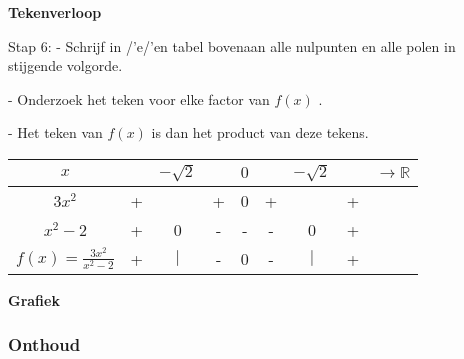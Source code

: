 \textbf{Tekenverloop}

Stap 6: - Schrijf in /'e/'en tabel bovenaan alle nulpunten en alle polen
in stijgende volgorde. 

- Onderzoek het teken voor elke factor van $f(x)$ . 

- Het teken van $f(x)$ is dan het product van deze tekens.

\medskip{}


\begin{tabular}{|c||c|c|c|c|c|c|c|c|}
\hline 
$x$ &  & $-\sqrt{2}$ &  & $0$ &  & $-\sqrt{2}$ &  & ${\displaystyle \longrightarrow\mathbb{R}}$\tabularnewline
\hline 
\hline 
${\displaystyle 3x^{2}}$ & + &  & + & 0 & + &  & + & \tabularnewline
\hline 
${\displaystyle x^{2}-2}$ & + & 0 & - & - & - & 0 & + & \tabularnewline
\hline 
\hline 
${\displaystyle f(x)=\frac{3x^{2}}{x^{2}-2}}$ & + & $\mid$ & - & 0 & - & $\mid$ & + & \tabularnewline
\hline 
\end{tabular}

\textbf{Grafiek}



\medskip{}



\subsubsection{Onthoud}

